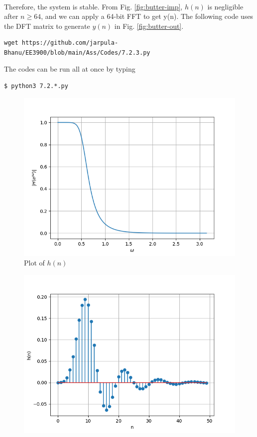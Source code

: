 \documentclass[journal,12pt,twocolumn]{IEEEtran}
\renewcommand\thesection{\arabic{section}}
\begin{document}
\begin{enumerate}[label=\thesection.\arabic*]
\begin{align}
\end{align}
Therefore, the system is stable. From
Fig. \eqref{fig:butter-imp}, $h(n)$ is negligible after $n \geq 64$, and we
can apply a 64-bit FFT to get y(n). The following code uses the DFT matrix
to generate $y(n)$ in Fig. \eqref{fig:butter-out}.
\begin{lstlisting}
wget https://github.com/jarpula-Bhanu/EE3900/blob/main/Ass/Codes/7.2.3.py
\end{lstlisting}
The codes can be run all at once by typing
\begin{lstlisting}
$ python3 7.2.*.py
\end{lstlisting}
\begin{figure}[!htb]
	\includegraphics[width=\columnwidth]{figs/7.2.1.png}
	\caption{Plot of $h(n)$}
	\label{fig:butter-imp}
\end{figure}
\begin{figure}[!htb]
	\includegraphics[width=\columnwidth]{figs/7.2.2.png}

\end{figure}
\end{enumerate}
\end{document}
